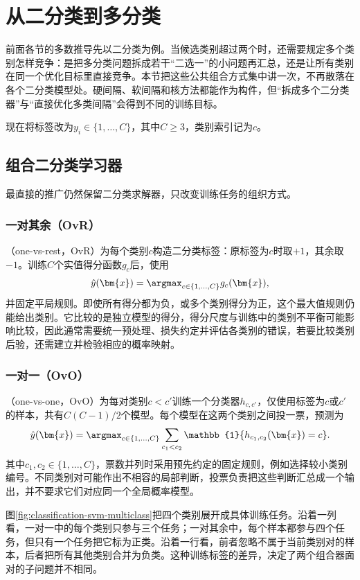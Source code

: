 \section{从二分类到多分类}
\label{sec:classification-multiclass}

前面各节的多数推导先以二分类为例。当候选类别超过两个时，还需要规定多个类别怎样竞争：是把多分类问题拆成若干“二选一”的小问题再汇总，还是让所有类别在同一个优化目标里直接竞争。本节把这些公共组合方式集中讲一次，不再散落在各个二分类模型处。硬间隔、软间隔和核方法都能作为构件，但“拆成多个二分类器”与“直接优化多类间隔”会得到不同的训练目标。

现在将标签改为$y_i\in\{1,\ldots,C\}$，其中$C\ge3$，类别索引记为$c$。

\subsection{组合二分类学习器}
\label{sec:classification-combinations}

最直接的推广仍然保留二分类求解器，只改变训练任务的组织方式。

\subsubsection{一对其余（OvR）}
（one-vs-rest，OvR）为每个类别$c$构造二分类标签：原标签为$c$时取$+1$，其余取$-1$。训练$C$个实值得分函数$g_c$后，使用
\[
  \hat y(\bm{x})=\argmax_{c\in\{1,\ldots,C\}}g_c(\bm{x}),
\]
并固定平局规则。即使所有得分都为负，或多个类别得分为正，这个最大值规则仍能给出类别。它比较的是独立模型的得分，得分尺度与训练中的类别不平衡可能影响比较，因此通常需要统一预处理、损失约定并评估各类别的错误，若要比较类别后验，还需建立并检验相应的概率映射。

\subsubsection{一对一（OvO）}
（one-vs-one，OvO）为每对类别$c<c'$训练一个分类器$h_{c,c'}$，仅使用标签为$c$或$c'$的样本，共有$C(C-1)/2$个模型。每个模型在这两个类别之间投一票，预测为
\[
  \hat y(\bm{x})
  =\argmax_{c\in\{1,\ldots,C\}}
     \sum_{c_1<c_2}\mathbb{1}\{h_{c_1,c_2}(\bm{x})=c\}.
\]
其中$c_1,c_2\in\{1,\ldots,C\}$，票数并列时采用预先约定的固定规则，例如选择较小类别编号。不同类别对可能作出不相容的局部判断，投票负责把这些判断汇总成一个输出，并不要求它们对应同一个全局概率模型。

图\ref{fig:classification-svm-multiclass}把四个类别展开成具体训练任务。沿着一列看，一对一中的每个类别只参与三个任务；一对其余中，每个样本都参与四个任务，但只有一个任务把它标为正类。沿着一行看，前者忽略不属于当前类别对的样本，后者把所有其他类别合并为负类。这种训练标签的差异，决定了两个组合器面对的子问题并不相同。

